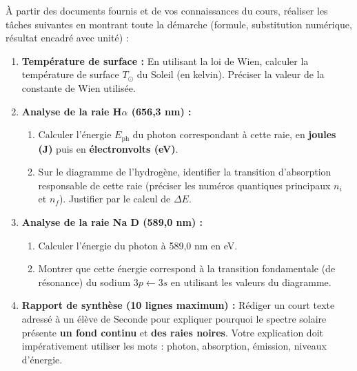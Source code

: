 \documentclass[11pt]{article}
\newcommand{\cle}[1]{{\popxbold\color{popdark}#1}}
\newcounter{popsec}
\newcounter{popsub}
\newcommand{\courssub}[1]{%
  \stepcounter{popsub}%
  \par\vspace{9pt}\noindent{\popxbold\fontsize{11.5}{13}\selectfont\color{popink}{\color{poporange}\thepopsec.\thepopsub}\hspace{6pt}#1}\par\nopagebreak\vspace{4pt}
}
\begin{document}
\courssub{Consignes}
À partir des documents fournis et de vos connaissances du cours, réaliser les tâches suivantes en montrant toute la démarche (formule, substitution numérique, résultat encadré avec unité) :

\begin{enumerate}
    \item \textbf{Température de surface :} En utilisant la \cle{loi de Wien}, calculer la température de surface $T_{\odot}$ du Soleil (en kelvin). Préciser la valeur de la constante de Wien utilisée.
    \item \textbf{Analyse de la raie H$\alpha$ (656,3 nm) :}
    \begin{enumerate}
        \item Calculer l'énergie $E_{\text{ph}}$ du photon correspondant à cette raie, en \textbf{joules (J)} puis en \textbf{électronvolts (eV)}.
        \item Sur le diagramme de l'hydrogène, identifier la transition d'absorption responsable de cette raie (préciser les numéros quantiques principaux $n_i$ et $n_f$). Justifier par le calcul de $\Delta E$.
    \end{enumerate}
    \item \textbf{Analyse de la raie Na D (589,0 nm) :}
    \begin{enumerate}
        \item Calculer l'énergie du photon à 589,0 nm en eV.
        \item Montrer que cette énergie correspond à la transition fondamentale (de résonance) du sodium $3p \leftarrow 3s$ en utilisant les valeurs du diagramme.
    \end{enumerate}
    \item \textbf{Rapport de synthèse (10 lignes maximum) :} Rédiger un court texte adressé à un élève de Seconde pour expliquer pourquoi le spectre solaire présente \textbf{un fond continu} et \textbf{des raies noires}. Votre explication doit impérativement utiliser les mots : \cle{photon}, \cle{absorption}, \cle{émission}, \cle{niveaux d'énergie}.
\end{enumerate}
\end{document}
